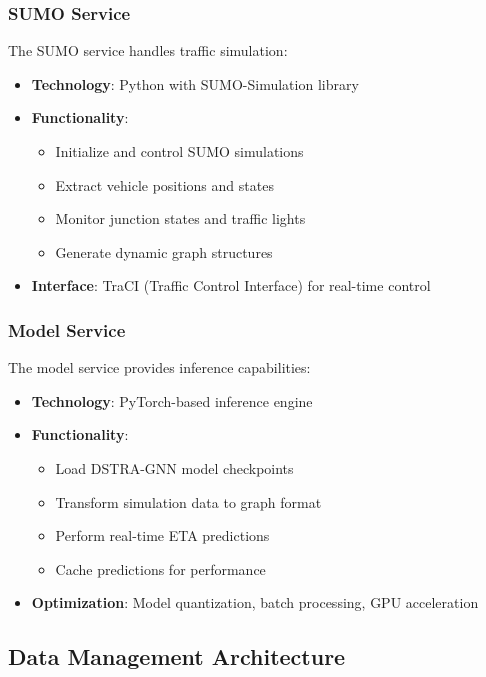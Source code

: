 \subsubsection{SUMO Service}

The SUMO service handles traffic simulation:
\begin{itemize}
    \item \textbf{Technology}: Python with SUMO-Simulation library
    \item \textbf{Functionality}:
    \begin{itemize}
        \item Initialize and control SUMO simulations
        \item Extract vehicle positions and states
        \item Monitor junction states and traffic lights
        \item Generate dynamic graph structures
    \end{itemize}
    \item \textbf{Interface}: TraCI (Traffic Control Interface) for real-time control
\end{itemize}

\subsubsection{Model Service}

The model service provides inference capabilities:
\begin{itemize}
    \item \textbf{Technology}: PyTorch-based inference engine
    \item \textbf{Functionality}:
    \begin{itemize}
        \item Load DSTRA-GNN model checkpoints
        \item Transform simulation data to graph format
        \item Perform real-time ETA predictions
        \item Cache predictions for performance
    \end{itemize}
    \item \textbf{Optimization}: Model quantization, batch processing, GPU acceleration
\end{itemize}

\subsection{Data Management Architecture}

